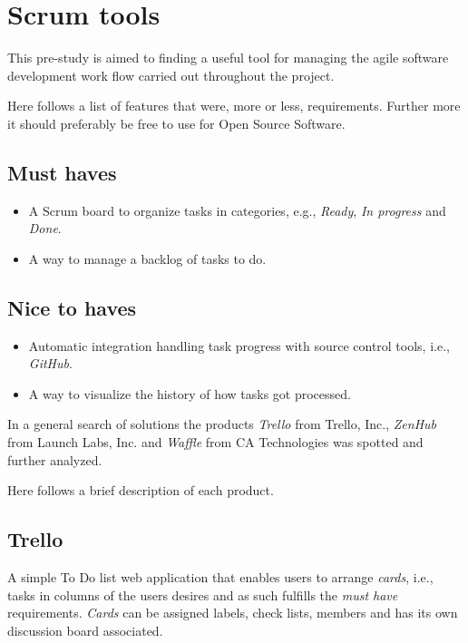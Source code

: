 \section{Scrum tools}\label{preStudy:scrum}
This pre-study is aimed to finding a useful tool for managing the agile software development work flow carried out throughout the project.

Here follows a list of features that were, more or less, requirements. Further more it should preferably be free to use for Open Source Software.

\subsection*{Must haves}
\begin{itemize}
\item A Scrum board to organize tasks in categories, e.g., \textit{Ready}, \textit{In progress} and \textit{Done}.
\item A way to manage a backlog of tasks to do.
\end{itemize}

\subsection*{Nice to haves}
\begin{itemize}
\item Automatic integration handling task progress with source control tools, i.e., \textit{GitHub}.
\item A way to visualize the history of how tasks got processed.
\end{itemize}

In a general search of solutions the products \textit{Trello} from Trello, Inc., \textit{ZenHub} from Launch Labs, Inc. and \textit{Waffle} from CA Technologies was spotted and further analyzed.

Here follows a brief description of each product.

\subsection*{Trello}
A simple To Do list web application that enables users to arrange \textit{cards}, i.e., tasks in columns of the users desires and as such fulfills the \textit{must have} requirements.
\textit{Cards} can be assigned labels, check lists, members and has its own discussion board associated.

